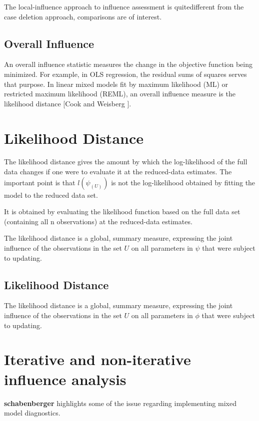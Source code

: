 \documentclass[a4paper,12pt]{article}
\begin{document}
The local-influence approach to influence assessment is quitedifferent from the case deletion approach, comparisons are of interest.



\subsection{Overall Influence}
An overall influence statistic measures the change in the objective function being minimized. For example, in
OLS regression, the residual sums of squares serves that purpose. In linear mixed models fit by
 maximum likelihood (ML) or  restricted maximum likelihood (REML), an overall influence measure is the  likelihood distance [Cook and Weisberg ].

\newpage

\section{Likelihood Distance} %
The likelihood distance gives the amount by which the log-likelihood of the full data changes if one were
to evaluate it at the reduced-data estimates. The important point is that $l(\psi_{(U)})$ is not the log-likelihood
obtained by fitting the model to the reduced data set.

It is obtained by evaluating the likelihood function based on the full data set (containing all n observations) at the reduced-data estimates.

The likelihood distance is a global, summary measure, expressing the joint influence of the observations in
the set $U$ on all parameters in $\psi$  that were subject to updating.

\subsection{Likelihood Distance}

The  likelihood distance is a global, summary measure, expressing the joint influence of the observations in the set $U$ on all parameters in $\phi$  that were subject to updating.





\section{Iterative and non-iterative influence analysis} %
\textbf{schabenberger} highlights some of the issue regarding implementing mixed model diagnostics.
\end{document}
